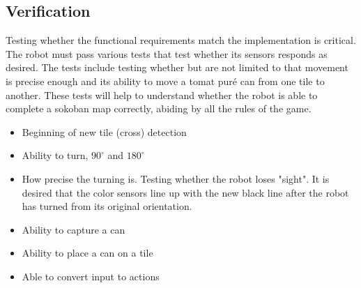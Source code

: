 \documentclass[../../main.tex]{subfiles}
\begin{document}
\subsection{Verification}%
\label{sub:verification}

Testing whether the functional requirements match the implementation is critical.
The robot must pass various tests that test whether its sensors responds as desired. The tests include testing whether but are not limited to that movement is precise enough and its ability to move a tomat puré can from one tile to another. These tests will help to understand whether the robot is able to complete a sokoban map correctly, abiding by all the rules of the game.

\begin{itemize}
	\item Beginning of new tile (cross) detection
	
	\item Ability to turn, $90^{\circ}$ and $180^{\circ}$
	
	\item How precise the turning is. Testing whether the robot loses "sight". It is desired that the color sensors line up with the new black line after the robot has turned from its original orientation.
	
	\item Ability to capture a can
	
	\item Ability to place a can on a tile
	
	\item Able to convert input to actions
	
	
\end{itemize}


	
\end{document}
